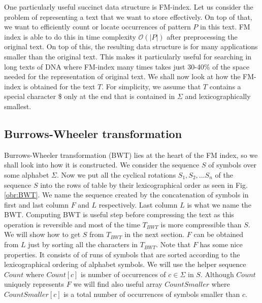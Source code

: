 One particularly useful succinct data structure is FM-index. Let us consider the
problem of representing a text that we want to store effectively. On top of that,
we want to efficiently count or locate occurrences of pattern $P$ in this text.
FM index is able to do this in time complexity $\mathcal{O}(|P|)$ after preprocessing the
original text. On top of this, the resulting data structure is for many applications
smaller than the original text. This makes it particularly useful for searching in
long texts of DNA where FM-index many times takes just 30-40\% of the space needed
for the representation of original text. We shall now look at how the FM-index
is obtained for the text $T$. For simplicity, we assume that $T$ contains a special
character \$ only at the end that is contained in $\Sigma$ and lexicographically smallest.

\subsection{Burrows-Wheeler transformation}

Burrows-Wheeler transformation (BWT) lies at the heart of the FM index, so we shall
look into how it is constructed. We consider the sequence $S$ of symbols over
some alphabet $\Sigma$. Now we put all the cyclical rotations $S_1, S_2, \ldots S_n$ of the
sequence $S$ into the rows of table by their lexicographical order as seen in Fig. \ref{obr:BWT}.
We name the sequence
created by the concatenation of symbols in first and last column $F$ and $L$ respectively.
Last column $L$ is what we name the BWT. Computing BWT is useful step before compressing
the text as this operation is reversible and most of the time $T_{BWT}$ is more compressible
than $S$. We will show how to get $S$ from $T_{BWT}$ in the next section. $F$ can be obtained
from $L$ just by sorting all the characters in $T_{BWT}$. Note that $F$ has some nice properties.
It consists of of runs of symbols that are sorted according to the lexicographical
ordering of alphabet symbols. We will use the helper sequence $Count$ where $Count[c]$ is
number of occurrences of $c\in\Sigma$ in $S$. Although $Count$ uniquely represents $F$ we will
find also useful array $CountSmaller$ where $CountSmaller[c]$ is a total number of occurrences
of symbols smaller than $c$.

